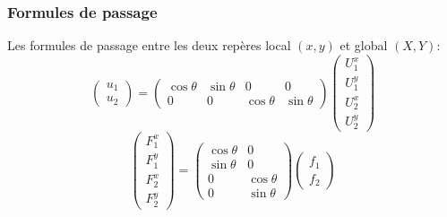 \documentclass{beamer}
\begin{document}
\begin{frame}
\frametitle{Formules de passage}
Les formules de passage entre les deux repères local $(x,y)$ et global $(X,Y)$:
\[\left(\begin{array}{l} 
u_{1}\\u_{2}
\end{array}\right) = \left(\begin{array}{cccc} 
\cos\theta &\sin\theta&0&0\\
0&0&\cos\theta &\sin\theta
\end{array}\right) \left(\begin{array}{l} 
U_{1}^x\\U_{1}^y\\U_{2}^x\\U_{2}^y
\end{array}\right)  \]
\[\left(\begin{array}{l} 
F_{1}^x\\F_{1}^y\\F_{2}^x\\F_{2}^y
\end{array}\right)   = \left(\begin{array}{cc} 
\cos\theta &0\\
\sin\theta& 0\\
0&\cos\theta \\
0 &\sin\theta
\end{array}\right)  \left(\begin{array}{l} 
f_{1}\\f_{2}
\end{array}\right)  \]


\end{frame}
\end{document}
